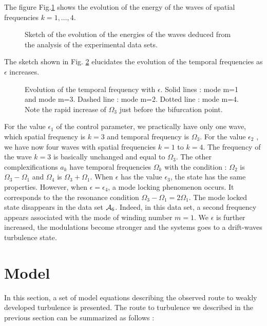 The figure Fig.\ref{poidsforme} shows the evolution of the energy of
the waves of spatial frequencies $k=1, \dots,4$.
\begin{figure}[htb]
 \centering
 \caption{Sketch of the evolution of the energies of the waves deduced
from the analysis of the experimental data sets.}
 \label{poidsforme}
\end{figure}
The sketch shown in Fig. \ref{lock} elucidates 
the evolution of the temporal frequencies 
as $\epsilon$ increases.
\begin{figure}[htb]
 \centering

 \caption{Evolution of the temporal frequency with $\epsilon$.
Solid lines : mode m=1 and mode m=3. Dashed line : mode m=2.
Dotted line : mode m=4. Note the rapid increase of $\Omega_3$ just before
the bifurcation point.}
 \label{lock}
\end{figure}
%
 For the value
$\epsilon_1$ of
the control parameter, we practically have only one wave, which spatial
frequency is $k=3$ and temporal frequency is $\Omega_3$. For the value
$\epsilon_2$ , we have now four waves with spatial
frequencies $k=1$ to $k=4$. The frequency of the wave $k=3$ is
basically unchanged and equal to $\Omega_3$. The other
complexifications $a_k$ have temporal frequencies $\Omega_k$ with the
condition : $\Omega_2$ is $\Omega_3-\Omega_1$ and $\Omega_4$ is
$\Omega_3+\Omega_1$. When $\epsilon$ has the value $\epsilon_3$, the
state has the same properties. However, when $\epsilon=\epsilon_4$, a
mode locking phenomenon occurs. It corresponds to the the resonance
condition 
$\Omega_3-\Omega_1=2\Omega_1$.
The mode locked state disappears in the 
data set  ${\cal A}_6$. Indeed, in this data set,
a second frequency appears
associated with the mode of winding number $m=1$.
We $\epsilon$ is further increased, the modulations become stronger
and the systems goes to a drift-waves turbulence state.

\section{Model}\label{Model}
In this section, a set of model equations describing the observed 
 route to  weakly developed turbulence is presented.
The route to turbulence we described in the previous section can be
summarized as follows : 



